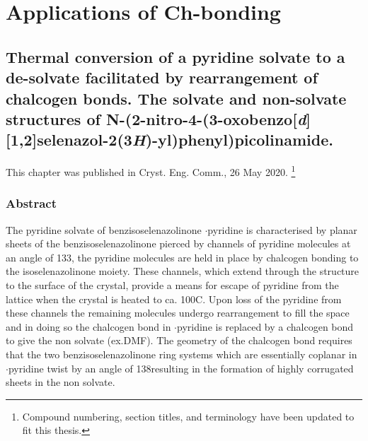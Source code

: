 \part{Applications of Ch-bonding}

\chapter[Thermal rearrangement of a Ch-bonded solvate]{Thermal conversion of a pyridine solvate to a de-solvate facilitated by rearrangement of chalcogen bonds. The solvate and non-solvate structures of N-(2-nitro-4-(3-oxobenzo[\emph{d}][1,2]selenazol-2(3\emph{H})-yl)phenyl)picolinamide.}

This chapter was published in Cryst. Eng. Comm., 26 May 2020\autocite{Fellowes2020a}. \footnote{Compound numbering, section titles, and terminology have been updated to fit this thesis.}

\section{Abstract}
The pyridine solvate of benzisoselenazolinone $\cdot$pyridine is characterised by planar sheets of the benzisoselenazolinone  pierced by channels of pyridine molecules at an angle of 133\degree, the pyridine molecules are held in place by  chalcogen bonding to the isoselenazolinone moiety.
These channels, which extend through the structure to the surface of the crystal, provide a means for escape of pyridine from the lattice when the crystal is heated to ca. 100\degree C. 
Upon loss of the pyridine from these channels the remaining molecules undergo rearrangement to fill the space and in doing so the  chalcogen bond in $\cdot$pyridine is replaced by a  chalcogen bond to give the non solvate (ex.DMF). 
The geometry of the chalcogen bond requires that the two benzisoselenazolinone ring systems which are essentially coplanar in $\cdot$pyridine twist by an angle of 138\degree resulting in the formation of highly corrugated sheets in the non solvate.

